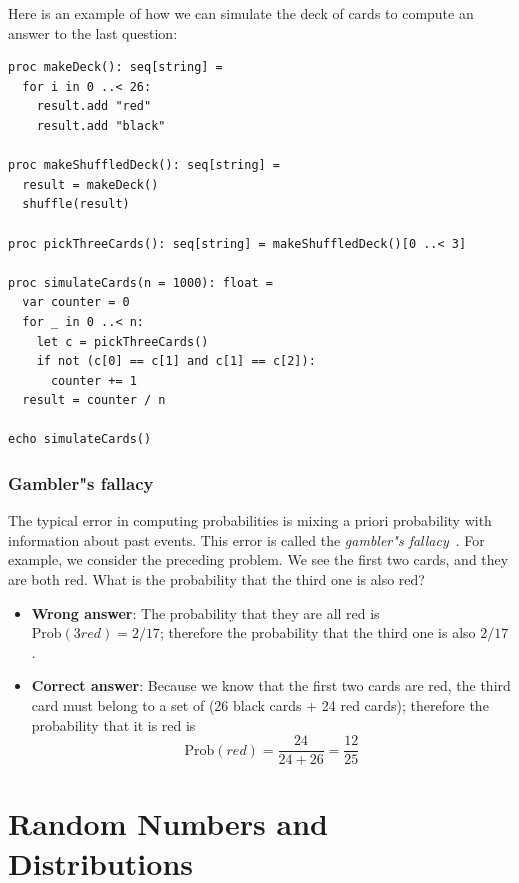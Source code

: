 \documentclass[justified, sixbynine]{tufte-book}
\theoremstyle{plain}%
\newtheorem * {corollary}{Corollary}
\theoremstyle{definition}
\theoremstyle{remark}
\newtheorem * {remark}{Remark}
\newtheorem * {note}{Note}
\begin{document}
\begin{fullwidth}
Here is an example of how we can simulate the deck of cards to compute an answer to the last question:

\begin{lstlisting}
proc makeDeck(): seq[string] =
  for i in 0 ..< 26:
    result.add "red"
    result.add "black"

proc makeShuffledDeck(): seq[string] =
  result = makeDeck()
  shuffle(result)

proc pickThreeCards(): seq[string] = makeShuffledDeck()[0 ..< 3]

proc simulateCards(n = 1000): float =
  var counter = 0
  for _ in 0 ..< n:
    let c = pickThreeCards()
    if not (c[0] == c[1] and c[1] == c[2]):
      counter += 1
  result = counter / n

echo simulateCards()
\end{lstlisting}

\goodbreak\subsection{Gambler"s fallacy}

The typical error in computing probabilities is mixing a priori probability
with information about past events.
This error is called the {\it gambler"s fallacy}~\cite{gambler}.
For example, we consider the preceding problem. We see the first two cards, and they are both red. What is the
probability that the third one is also red?

\begin{itemize}
\item  {\bf Wrong answer}: The probability that they are all red is $%
\textrm{Prob}(3red)=2/17$; therefore the probability that the third one is also $2/17$.

\item  {\bf Correct answer}: Because we know that the first two cards are red, the third card must belong to a set of (26 black cards + 24 red cards);
therefore the probability that it is red is
\begin{equation}
\textrm{Prob}(red)=\frac{24}{24+26}=\frac{12}{25}
\end{equation}
\end{itemize}




\chapter{Random Numbers and Distributions}


\end{fullwidth}
\end{document}
